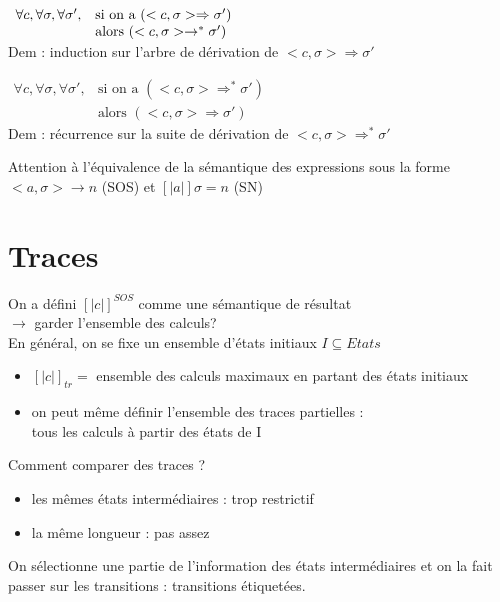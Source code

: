 \documentclass[10pt,a4paper]{article}
\newcommand{\semm}[1]{\left[| #1 | \right]}
\begin{document}
\begin{lem}{1} 
$ \begin{array}{l l}
\forall c, \forall \sigma, \forall \sigma', & \text{si on a }(<c, \sigma> \Rightarrow \sigma')\\
											& \text{alors } (<c, \sigma> \rightarrow^* \sigma')
\end{array}$\\
Dem : induction sur l'arbre de dérivation de $<c, \sigma> \Rightarrow \sigma'$\\
\end{lem}

\begin{lem}{2} 
$ \begin{array}{ll}
\forall c, \forall \sigma, \forall \sigma', &\text{si on a }(<c, \sigma> \Rightarrow^* \sigma')\\
											& \text{alors } (<c, \sigma> \Rightarrow \sigma')
\end{array}$\\
Dem : récurrence sur la suite de dérivation de $<c, \sigma> \Rightarrow^* \sigma'$\\
\end{lem}

\begin{rem}{}Attention à l'équivalence de la sémantique des expressions sous la forme $<a, \sigma> \rightarrow n$ (SOS) et $\semm{a} \sigma = n$ (SN)\\
\end{rem}

\part{Traces}
On a défini $\semm{c}^{SOS}$ comme une sémantique de résultat\\
$\longrightarrow$ garder l'ensemble des calculs?\\
En général, on se fixe un ensemble d'états initiaux $I \subseteq Etats$
\begin{itemize}
\item $\semm{c}_{tr} = $ ensemble des calculs maximaux en partant des états initiaux
\item on peut même définir l'ensemble des traces partielles : \\
tous les calculs à partir des états de I
\end{itemize}

Comment comparer des traces ? \begin{itemize}
\item les mêmes états intermédiaires : trop restrictif
\item la même longueur : pas assez
\end{itemize}
On sélectionne une partie de l'information des états intermédiaires et on la fait passer sur les transitions : transitions étiquetées.
\end{document}

